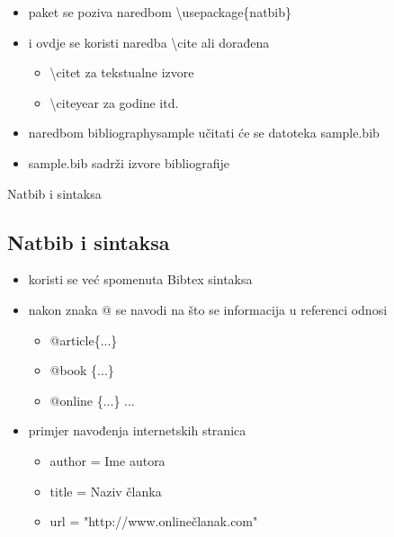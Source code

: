 \documentclass{beamer}
\begin{document}
\begin{frame}
\begin{itemize}
	\item paket se poziva naredbom \textbackslash usepackage\{natbib\}\\
	\item i ovdje se koristi naredba \textbackslash cite ali dorađena\\
	\begin{itemize}
		\item \textbackslash citet za tekstualne izvore \\
		\item \textbackslash citeyear za godine itd. \\
	\end{itemize}  
	\item naredbom \textbacklash bibliography{sample} učitati će se datoteka sample.bib \\
	\item sample.bib sadrži izvore bibliografije \\
\end{itemize}
\end{frame}

\begin{frame}{Natbib i sintaksa}
\subsection{Natbib i sintaksa}
\begin{itemize}
	\item koristi se već spomenuta Bibtex sintaksa \\
	\item nakon znaka @ se navodi na što se informacija u referenci odnosi \\
	\begin{itemize}
		\item @article\{...\} \\
		\item @book \{...\}\\
		\item @online \{...\} ... \\
	\end{itemize}
	\item primjer navođenja internetskih stranica \\
		\begin{itemize}
			\item author = Ime autora \\
			\item title = Naziv članka \\
			\item url = "http://www.onlinečlanak.com" \\
		\end{itemize}
\end{itemize}
\end{frame}
\end{document}

